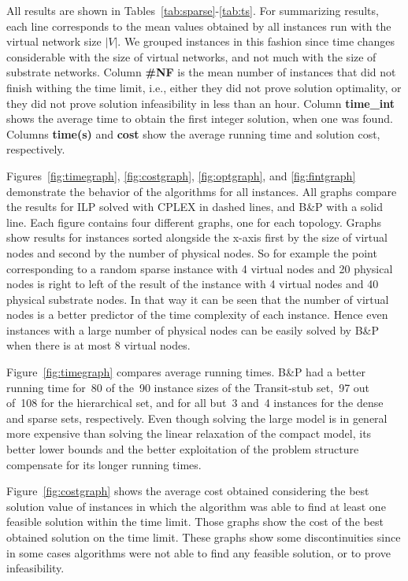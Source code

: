 \documentclass[conference]{IEEEtran}
\begin{document}
All results are shown in Tables~\ref{tab:sparse}-\ref{tab:ts}. 
For summarizing results, each line corresponds to the mean values obtained by all instances run with the virtual network size $|V|$. 
We grouped instances in this fashion since time changes considerable with the size of virtual networks, and not much with the size of substrate networks.
Column \textbf{\#NF} is the mean number of instances that did not finish withing the time limit, i.e., 
either they did not prove solution optimality, or they did not prove solution infeasibility in less than an hour. 
Column \textbf{time\_int} shows the average time to obtain the first integer solution, when one was found. 
Columns \textbf{time(s)} and \textbf{cost} show the average running time and solution cost, respectively.

Figures~\ref{fig:timegraph}, \ref{fig:costgraph}, \ref{fig:optgraph}, and \ref{fig:fintgraph} demonstrate the behavior of the algorithms for all instances. All graphs compare the results for ILP solved with CPLEX in dashed lines, and B\&P with a solid line. 
Each figure contains four different graphs, one for each topology. 
Graphs show results for instances sorted alongside the x-axis first by the size of virtual nodes and second by the number of physical nodes. 
So for example the point corresponding to a random sparse instance with 4 virtual nodes and 20 physical nodes is right to left of the result of the instance with 4 virtual nodes and 40 physical substrate nodes. 
In that way it can be seen that the number of virtual nodes is a better predictor of the time complexity of each instance. 
Hence even instances with a large number of physical nodes can be easily solved by B\&P when there is at most 8 virtual nodes.

Figure~\ref{fig:timegraph} compares average running times. 
B\&P had a better running time for~80 of the~90 instance sizes of the Transit-stub set,~97 out of~108 for the hierarchical set, and for all but~3 and~4 instances for the dense and sparse sets, respectively.
Even though solving the large model is in general more expensive than solving the linear relaxation of the compact model, its better lower bounds and the better exploitation of the problem structure compensate for its longer running times.

Figure~\ref{fig:costgraph} shows the average cost obtained considering the best solution value of instances in which the algorithm was able to find at least one feasible solution within the time limit.
Those graphs show the cost of the best obtained solution on the time limit. 
These graphs show some discontinuities since in some cases algorithms were not able to find any feasible solution, or to prove infeasibility.
\end{document}
